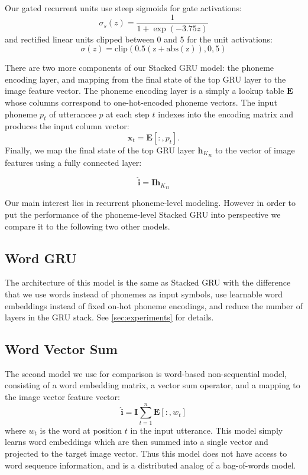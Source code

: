 Our gated recurrent units use steep sigmoids for gate activations: \[
\sigma_s(z) = \frac{1}{1 + \exp(-3.75z)} 
\]
and rectified linear units clipped between 0 and 5 for the unit
activations:
\[
\sigma(z) = \mathrm{clip(0.5(z+\mathrm{abs}(z)), 0, 5)}
\]

There are two more components of our {\sc Stacked GRU} model: the
phoneme encoding layer, and mapping from the final state of the top GRU
layer to the image feature vector.
The phoneme encoding layer is a simply a lookup table $\mathbf{E}$ whose
columns correspond to one-hot-encoded phoneme vectors. The input
phoneme $p_t$ of utterancee $p$ at each step $t$ indexes into the
encoding matrix and produces the input column vector:
\begin{equation}
  \mathbf{x}_t = \mathbf{E}[:,p_t].
\end{equation}
Finally, we map the final state of the top GRU layer ${\mathbf{h}_K}_n$
to the vector of image features using a fully connected layer:

\begin{equation}
  \hat{\mathbf{i}} = \mathbf{I} {\mathbf{h}_K}_n
\end{equation}

Our main interest lies in  recurrent phoneme-level modeling. However in order to
put the performance of the phoneme-level {\sc Stacked GRU} into
perspective we compare it to the following two other models.


\subsection{Word GRU}
The architecture of this model is the same as {\sc Stacked GRU} with
the difference that we use words instead of phonemes as input symbols,
use learnable word embeddings instead of fixed on-hot phoneme
encodings, and reduce the number of layers in the GRU stack. See
\ref{sec:experiments} for details.
\subsection{Word Vector Sum}
The second model we use for comparison is word-based non-sequential
model, consisting of a word embedding matrix, a vector sum operator,
and a mapping to the image vector feature vector:
\begin{equation}
  \label{eq:sum}
  \hat{\mathbf{i}} = \mathbf{I} \sum_{t=1}^n \mathbf{E}[:,w_t]
\end{equation}
where $w_t$ is the word at position $t$ in the input utterance.
This model simply learns word embeddings which are then summed into a
single vector and projected to the target image vector. Thus this model does
not have access to word sequence information, and is a distributed
analog of a bag-of-words model.
